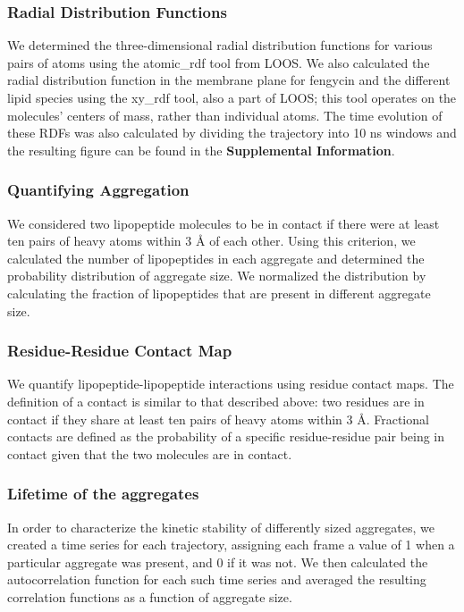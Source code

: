 \subsubsection{Radial Distribution Functions}
\label{sss:ch2_rdf}
We determined the three-dimensional radial distribution functions for various pairs of atoms using the
atomic\_rdf tool from LOOS.\cite{Grossfield2014,Grossfield2009} We also
calculated the radial distribution function in the membrane plane for fengycin
and the different lipid species using the xy\_rdf tool, also a part of LOOS; this tool operates on the molecules' centers of mass, rather
than individual atoms. The time evolution of these RDFs was also calculated by
dividing the trajectory into 10 ns windows and the resulting figure can be found in the \textbf{Supplemental Information}.

\subsubsection{Quantifying Aggregation}
\label{sss:ch2_agg}
We considered two lipopeptide molecules to be in contact if there were
at least ten pairs of heavy atoms within 3 {\AA} of each other.
Using this criterion, we calculated the number of lipopeptides in each aggregate
and determined the probability distribution of aggregate size.
We normalized the distribution by calculating the fraction of lipopeptides that are present in different
aggregate size.

\subsubsection{Residue-Residue Contact Map}
\label{sss:ch2_res-res_contact}

We quantify lipopeptide-lipopeptide interactions using residue contact maps.
The definition of a contact is similar to that described above: two residues are
in contact if they share at least ten pairs of heavy atoms within 3 {\AA}.
Fractional contacts are defined as the probability of a specific residue-residue
pair being in contact given that the two molecules are in contact.

\subsubsection{Lifetime of the aggregates}
\label{sss:ch2_lifetime}

In order to characterize the kinetic stability of differently sized aggregates,
we created a time series for each trajectory, assigning each frame a value of 1
 when a particular aggregate was present, and 0 if it was not.
We then calculated the autocorrelation function
for each such time series and averaged the resulting correlation
functions as a function of aggregate size.


